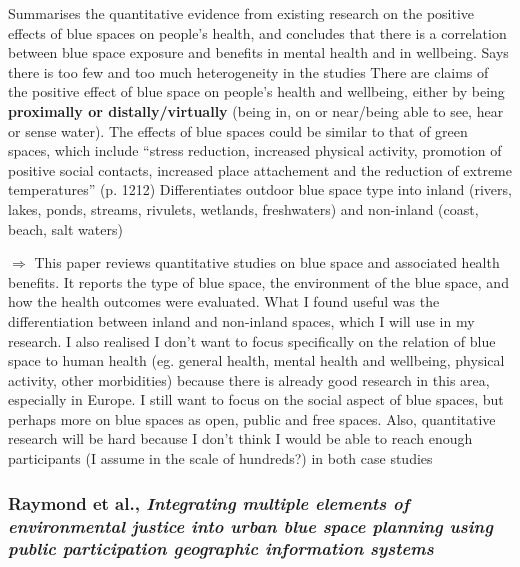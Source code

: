 \documentclass{article}
\begin{document}
\begin{outline}
	\1 Summarises the quantitative evidence from existing research on the positive effects of blue spaces on people's health, and concludes that there is a correlation between blue space exposure and benefits in mental health and in wellbeing. Says there is too few and too much heterogeneity in the studies
	\1 There are claims of the positive effect of blue space on people's health and wellbeing, either by being \textbf{proximally or distally/virtually} (being in, on or near/being able to see, hear or sense water). The effects of blue spaces could be similar to that of green spaces, which include ``stress reduction, increased physical activity, promotion of positive social contacts, increased place attachement and the reduction of extreme temperatures'' (p. 1212)
	\1 Differentiates outdoor blue space type into inland (rivers, lakes, ponds, streams, rivulets, wetlands, freshwaters) and non-inland (coast, beach, salt waters)
	
	\1 $\Rightarrow$ This paper reviews quantitative studies on blue space and associated health benefits. It reports the type of blue space, the environment of the blue space, and how the health outcomes were evaluated.
	What I found useful was the differentiation between inland and non-inland spaces, which I will use in my research. I also realised I don't want to focus specifically on the relation of blue space to human health (eg. general health, mental health and wellbeing, physical activity, other morbidities) because there is already good research in this area, especially in Europe. I still want to focus on the social aspect of blue spaces, but perhaps more on blue spaces as open, public and free spaces. Also, quantitative research will be hard because I don't think I would be able to reach enough participants (I assume in the scale of hundreds?) in both case studies
\end{outline}

\subsubsection{Raymond et al., \textit{Integrating multiple elements of environmental justice into urban blue space planning using public participation geographic information systems}} \parencite{raymond2016integrating}
\end{document}

